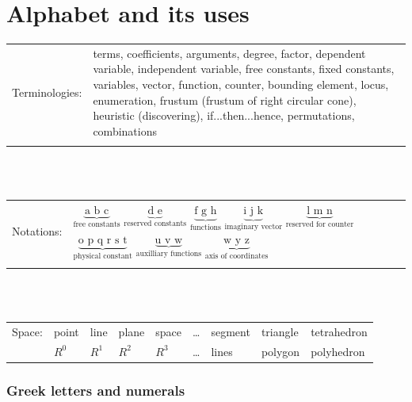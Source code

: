 \documentclass[10pt]{article}
\begin{document}
\section{Alphabet and its uses}

\begin{tabular}{p{3cm} p{13cm}}
Terminologies: & terms, coefficients, arguments, degree, factor, dependent variable, independent variable, free constants, fixed constants, variables, vector, function, counter, bounding element, locus, enumeration, frustum (frustum of right circular cone), heuristic (discovering), if...then...hence, permutations, combinations\\\\
\end{tabular}
\\\\
\begin{tabular}{p{3cm} p{13cm}}
Notations: & $\underbrace{\text{a b c}}_{\text{free constants}}$ \hspace{6pt}
$\underbrace{\text{d e}}_{\text{reserved constants}}$ \hspace{6pt}
$\underbrace{\text{f g h}}_{\text{functions}}$ \hspace{6pt}
$\underbrace{\text{i j k}}_{\text{imaginary vector}}$ \hspace{6pt}
$\underbrace{\text{l m n}}_{\text{reserved for counter}}$ \hspace{6pt}
$\underbrace{\text{o p q r s t}}_{\text{physical constant}}$  \hspace{6pt}
$\underbrace{\text{u v w}}_{\text{auxilliary functions}}$ \hspace{6pt}
$\underbrace{\text{w y z}}_{\text{axis of coordinates}}$\\\\
\end{tabular}
\\\\


\begin{tabular}{p{3cm} p{1cm} p{1cm} p{1cm} p{1cm} p{1cm} p{1cm} p{1cm} p{1cm}}

Space: & point & line & plane & space & \dots & segment & triangle & tetrahedron \\
       & $R^0$ & $R^1$ & $R^2$ & $R^3$ & \dots & lines & polygon & polyhedron \\
\end{tabular}

\subsubsection*{Greek letters and numerals}
\end{document}
